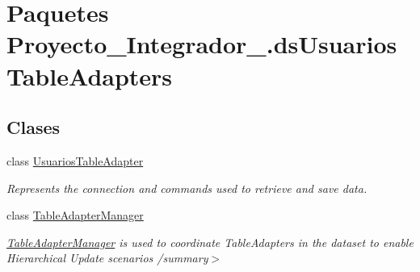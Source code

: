 \hypertarget{namespace_proyecto___integrador__3_1_1ds_usuarios_table_adapters}{\section{Paquetes Proyecto\-\_\-\-Integrador\-\_.\-ds\-Usuarios\-Table\-Adapters}
\label{namespace_proyecto___integrador__3_1_1ds_usuarios_table_adapters}
}
\subsection*{Clases}
\begin{DoxyCompactItemize}
\item 
class \hyperlink{class_proyecto___integrador__3_1_1ds_usuarios_table_adapters_1_1_usuarios_table_adapter}{Usuarios\-Table\-Adapter}
\begin{DoxyCompactList}\small\item\em Represents the connection and commands used to retrieve and save data. \end{DoxyCompactList}\item 
class \hyperlink{class_proyecto___integrador__3_1_1ds_usuarios_table_adapters_1_1_table_adapter_manager}{Table\-Adapter\-Manager}
\begin{DoxyCompactList}\small\item\em \hyperlink{class_proyecto___integrador__3_1_1ds_usuarios_table_adapters_1_1_table_adapter_manager}{Table\-Adapter\-Manager} is used to coordinate Table\-Adapters in the dataset to enable Hierarchical Update scenarios /summary$>$ \end{DoxyCompactList}\end{DoxyCompactItemize}
